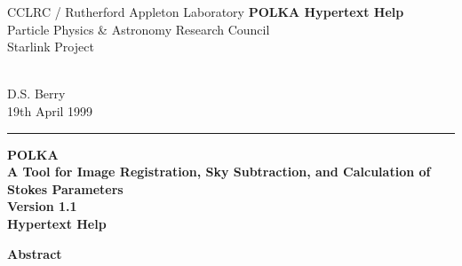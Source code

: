 \documentclass[11pt]{article}
\newcommand{\stardoccategory}  {}
\newcommand{\stardocnumber}    {}
\newcommand{\stardocauthors}   {D.S. Berry}
\newcommand{\stardocdate}      {19th April 1999}
\newcommand{\stardoctitle}     {POLKA \\ [1ex]
                                A Tool for Image Registration, Sky Subtraction,
                                and Calculation of Stokes Parameters}
\newcommand{\stardocversion}   {Version 1.1}
\newcommand{\stardocmanual}    {Hypertext Help}
\newcommand{\stardocname}{POLKA Hypertext Help}
\newenvironment{latexonly}{}{}
\begin{document}
\thispagestyle{empty}

\begin{latexonly}
   CCLRC / {\sc Rutherford Appleton Laboratory} \hfill {\bf \stardocname}\\
   {\large Particle Physics \& Astronomy Research Council}\\
   {\large Starlink Project\\}
   {\large \stardoccategory\ \stardocnumber}
   \begin{flushright}
   \stardocauthors\\
   \stardocdate
   \end{flushright}
   \vspace{-4mm}
   \rule{\textwidth}{0.5mm}
   \vspace{5mm}
   \begin{center}
   {\Huge\bf  \stardoctitle \\ [2.5ex]}
   {\LARGE\bf \stardocversion \\ [4ex]}
   {\Huge\bf  \stardocmanual}
   \end{center}
   \vspace{5mm}

   \vspace{10mm}
   \begin{center}
      {\Large\bf Abstract}
   \end{center}
\end{latexonly}
\end{document}
